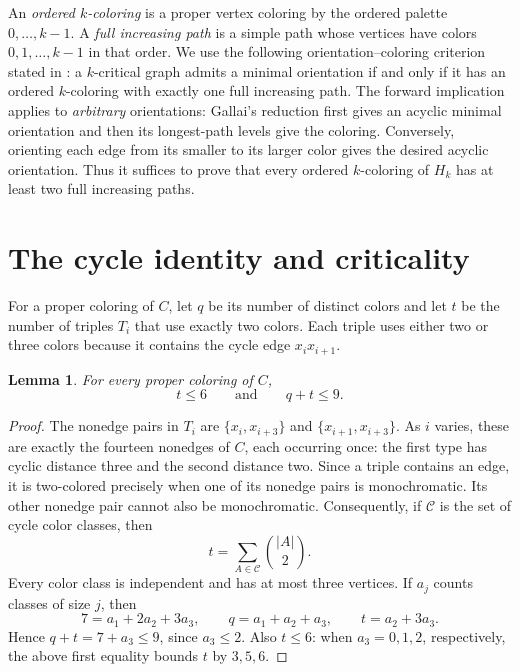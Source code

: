 \documentclass[11pt]{amsart}
\newtheorem{lemma}[theorem]{Lemma}
\begin{document}
An \emph{ordered $k$-coloring} is a proper vertex coloring by the
ordered palette $0,\ldots,k-1$.  A \emph{full increasing path} is a
simple path whose vertices have colors $0,1,\ldots,k-1$ in that order.
We use the following orientation--coloring criterion stated in
\cite[\S13.8]{JT}: a $k$-critical graph admits a minimal orientation if
and only if it has an ordered $k$-coloring with exactly one full
increasing path.  The forward implication applies to \emph{arbitrary}
orientations: Gallai's reduction first gives an acyclic minimal
orientation and then its longest-path levels give the coloring.
Conversely, orienting each edge from its smaller to its larger color
gives the desired acyclic orientation.  Thus it suffices to prove that
every ordered $k$-coloring of $H_k$ has at least two full increasing
paths.

\section{The cycle identity and criticality}

For a proper coloring of $C$, let $q$ be its number of distinct colors
and let $t$ be the number of triples $T_i$ that use exactly two colors.
Each triple uses either two or three colors because it contains the
cycle edge $x_ix_{i+1}$.

\begin{lemma}\label{lem:cycle}
For every proper coloring of $C$,
\begin{equation}\label{eq:cyclebound}
 t\leq6\qquad\text{and}\qquad q+t\leq9.
\end{equation}
\end{lemma}

\begin{proof}
The nonedge pairs in $T_i$ are $\{x_i,x_{i+3}\}$ and
$\{x_{i+1},x_{i+3}\}$.  As $i$ varies, these are exactly the fourteen
nonedges of $C$, each occurring once: the first type has cyclic
distance three and the second distance two.  Since a triple contains
an edge, it is two-colored precisely when one of its nonedge pairs is
monochromatic.  Its other nonedge pair cannot also be monochromatic.
Consequently, if $\mathcal C$ is the set of cycle color classes, then
\[
 t=\sum_{A\in\mathcal C}\binom{|A|}{2}.
\]
Every color class is independent and has at most three vertices.  If
$a_j$ counts classes of size $j$, then
\[
 7=a_1+2a_2+3a_3,\qquad q=a_1+a_2+a_3,\qquad
 t=a_2+3a_3.
\]
Hence $q+t=7+a_3\leq9$, since $a_3\leq2$.  Also $t\leq6$:
when $a_3=0,1,2$, respectively, the above first equality bounds $t$
by $3,5,6$.
\end{proof}
\end{document}
